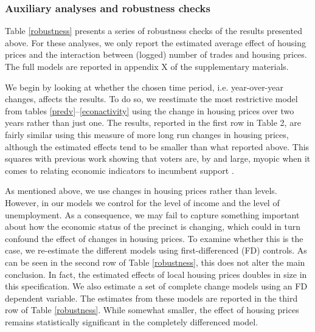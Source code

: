\documentclass[12pt,a4paper]{article}
\begin{document}
	\subsubsection{Auxiliary analyses and robustness checks}
	Table \ref{robustness} presents a series of robustness checks of the results presented above. For these analyses, we only report the estimated average effect of housing prices and the interaction between (logged) number of trades and housing prices. The full models are reported in appendix X of the supplementary materials.
	
	
	
	We begin by looking at whether the chosen time period, i.e. year-over-year changes, affects the results. To do so, we reestimate the most restrictive model from tables \ref{predv}--\ref{econactivity} using the change in housing prices over two years rather than just one. The results, reported in the first row in Table 2, are fairly similar using this measure of more long run changes in housing prices, although the estimated effects tend to be smaller than what reported above. This squares with previous work showing that voters are, by and large, myopic when it comes to relating economic indicators to incumbent support \citep{healy2009myopic,healy2014substituting}.
	
	As mentioned above, we use changes in housing prices rather than levels. However, in our models we control for the level of income and the level of unemployment. As a consequence,  we may fail to capture something important about how the economic status of the precinct is changing, which could in turn confound the effect of changes in housing prices. To examine whether this is the case, we re-estimate the different models using first-differenced (FD) controls. As can be seen in the second row of Table \ref{robustness}, this does not alter the main conclusion. In fact, the estimated effects of local housing prices doubles in size in this specification. We also estimate a set of complete change models using an FD dependent variable. The estimates from these models are reported in the third row of Table \ref{robustness}. While somewhat smaller, the effect of housing prices remains statistically significant in the completely differenced model.
	
\end{document}
